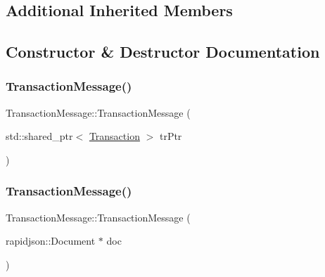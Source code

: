 \subsection*{Additional Inherited Members}


\subsection{Constructor \& Destructor Documentation}
\mbox{\label{classTransactionMessage_a8bb90fe0dc9dba6de05f27772f03c708}} 
\subsubsection{\texorpdfstring{Transaction\+Message()}{TransactionMessage()}\hspace{0.1cm}{\footnotesize\ttfamily [1/2]}}
{\footnotesize\ttfamily Transaction\+Message\+::\+Transaction\+Message (\begin{DoxyParamCaption}\item[{std\+::shared\+\_\+ptr$<$ \mbox{\hyperlink{classTransaction}{Transaction}} $>$}]{tr\+Ptr }\end{DoxyParamCaption})\hspace{0.3cm}{\ttfamily [explicit]}}

\mbox{\label{classTransactionMessage_a767282698bcd84202aa9eb59ef4feb2d}} 
\subsubsection{\texorpdfstring{Transaction\+Message()}{TransactionMessage()}\hspace{0.1cm}{\footnotesize\ttfamily [2/2]}}
{\footnotesize\ttfamily Transaction\+Message\+::\+Transaction\+Message (\begin{DoxyParamCaption}\item[{rapidjson\+::\+Document $\ast$}]{doc }\end{DoxyParamCaption})\hspace{0.3cm}{\ttfamily [explicit]}}



